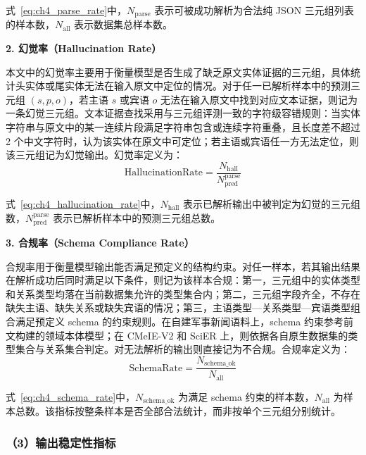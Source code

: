   式~\eqref{eq:ch4_parse_rate}中，$N_{\mathrm{parse}}$ 表示可被成功解析为合法纯 JSON 三元组列表的样本数，$N_{\mathrm{all}}$ 表示数据集总样本数。

  \textbf{2. 幻觉率（Hallucination Rate）} 
  
  本文中的幻觉率主要用于衡量模型是否生成了缺乏原文实体证据的三元组，具体统计头实体或尾实体无法在输入原文中定位的情况。对于任一已解析样本中的预测三元组 $(s,p,o)$，若主语 $s$ 或宾语 $o$ 无法在输入原文中找到对应文本证据，则记为一条幻觉三元组。文本证据查找采用与三元组评测一致的字符级容错规则：当实体字符串与原文中的某一连续片段满足字符串包含或连续字符重叠，且长度差不超过 2 个中文字符时，认为该实体在原文中可定位；若主语或宾语任一方无法定位，则该三元组记为幻觉输出。幻觉率定义为：
  \begin{equation}
  \mathrm{HallucinationRate}=\frac{N_{\mathrm{hall}}}{N_{\mathrm{pred}}^{\mathrm{parse}}}
  \label{eq:ch4_hallucination_rate}
  \end{equation}

  式~\eqref{eq:ch4_hallucination_rate}中，$N_{\mathrm{hall}}$ 表示已解析输出中被判定为幻觉的三元组数，$N_{\mathrm{pred}}^{\mathrm{parse}}$ 表示已解析样本中的预测三元组总数。

  \textbf{3. 合规率（Schema Compliance Rate）} 
  
  合规率用于衡量模型输出能否满足预定义的结构约束。对任一样本，若其输出结果在解析成功后同时满足以下条件，则记为该样本合规：第一，三元组中的实体类型和关系类型均落在当前数据集允许的类型集合内；第二，三元组字段齐全，不存在缺失主语、缺失关系或缺失宾语的情况；第三，主语类型—关系类型—宾语类型组合满足预定义 schema 的约束规则。在自建军事新闻语料上，schema 约束参考前文构建的领域本体模型；在 CMeIE-V2 和 SciER 上，则依据各自原生数据集的类型集合与关系集合判定。对无法解析的输出则直接记为不合规。合规率定义为：
  \begin{equation}
  \mathrm{SchemaRate}=\frac{N_{\mathrm{schema\_ok}}}{N_{\mathrm{all}}}
  \label{eq:ch4_schema_rate}
  \end{equation}

  式~\eqref{eq:ch4_schema_rate}中，$N_{\mathrm{schema\_ok}}$ 为满足 schema 约束的样本数，$N_{\mathrm{all}}$ 为样本总数。该指标按整条样本是否全部合法统计，而非按单个三元组分别统计。

\subsubsection*{（3）输出稳定性指标}

